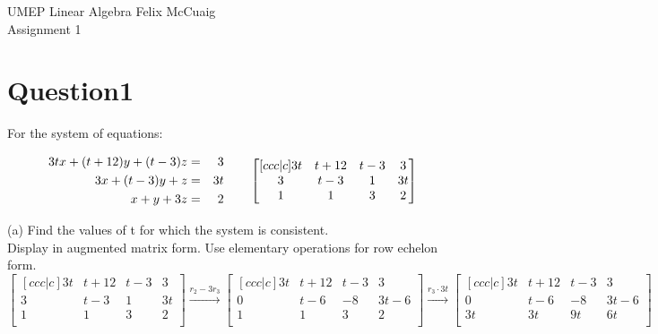 \documentclass[12pt]{article}
\begin{document}
UMEP Linear Algebra \hfill Felix McCuaig \\
Assignment 1

\section*{Question1}
For the system of equations:

\begin{align*}
\begin{aligned}
3tx + (t+12)y + (t-3)z &=& 3 \\
3x + (t-3)y + z &=& 3t \\
x+y+3z &=& 2 \\
\end{aligned} \hspace*{20px}
\begin{bmatrix}[ccc|c]
   3t & t+12 & t-3 & 3 \\
   3 & t-3 & 1 & 3t \\
   1 & 1 & 3 & 2 \\
\end{bmatrix}
\end{align*}

(a) Find the values of t for which the system is consistent.\\
\medskip
Display in augmented matrix form.
Use elementary operations for row echelon form.
$$
\begin{bmatrix}[ccc|c]
   3t & t+12 & t-3 & 3 \\
   3 & t-3 & 1 & 3t \\
   1 & 1 & 3 & 2 \\
\end{bmatrix} \overset{r_2-3r_3}{\longrightarrow} 
\begin{bmatrix}[ccc|c]
   3t & t+12 & t-3 & 3 \\
   0 & t-6 & -8 & 3t-6 \\
   1 & 1 & 3 & 2 \\
\end{bmatrix} \overset{r_3\cdot3t}{\longrightarrow} 
\begin{bmatrix}[ccc|c]
   3t & t+12 & t-3 & 3 \\
   0 & t-6 & -8 & 3t-6 \\
   3t & 3t & 9t & 6t \\
\end{bmatrix}
$$
\end{document}
